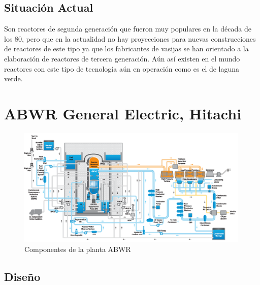 \documentclass[]{article}
\begin{document}
\subsection{Situación Actual}

Son reactores de segunda generación que fueron muy populares en la década de los 80, pero que en la actualidad no hay proyecciones para nuevas construcciones de reactores de este tipo ya que los fabricantes de vasijas se han orientado a la elaboración de reactores de tercera generación. Aún así existen en el mundo reactores con este tipo de tecnología aún en operación como es el de laguna verde.\\


\section{ABWR General Electric, Hitachi}

\begin{figure}[h!]
	\centering
	\includegraphics[width=0.99\textwidth]{diagramaABWR.png}
	\caption{Componentes de la planta ABWR \citep{Hitachi2007}}
	\label{fig:ReactorABWR}
\end{figure}


\subsection{Diseño}
\end{document}
